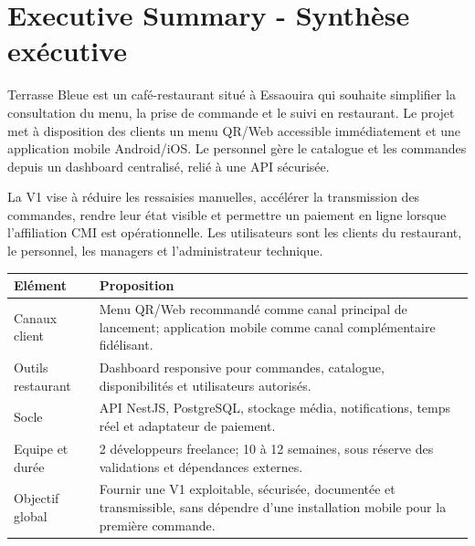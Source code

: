 \documentclass[10pt,a4paper]{article}
\begin{document}
\tableofcontents
\clearpage
{}

\setcounter{section}{0}
\section{Executive Summary - Synthèse exécutive}
Terrasse Bleue est un café-restaurant situé à Essaouira qui souhaite simplifier la consultation du menu, la prise de commande et le suivi en restaurant. Le projet met à disposition des clients un menu QR/Web accessible immédiatement et une application mobile Android/iOS. Le personnel gère le catalogue et les commandes depuis un dashboard centralisé, relié à une API sécurisée.

La V1 vise à réduire les ressaisies manuelles, accélérer la transmission des commandes, rendre leur état visible et permettre un paiement en ligne lorsque l'affiliation CMI est opérationnelle. Les utilisateurs sont les clients du restaurant, le personnel, les managers et l'administrateur technique.

\begin{tabularx}{\linewidth}{@{}L{4cm}Y@{}}
\toprule
\textbf{Elément} & \textbf{Proposition} \\
\midrule
Canaux client & Menu QR/Web recommandé comme canal principal de lancement; application mobile comme canal complémentaire fidélisant. \\
Outils restaurant & Dashboard responsive pour commandes, catalogue, disponibilités et utilisateurs autorisés. \\
Socle & API NestJS, PostgreSQL, stockage média, notifications, temps réel et adaptateur de paiement. \\
Equipe et durée & 2 développeurs freelance; 10 à 12 semaines, sous réserve des validations et dépendances externes. \\
Objectif global & Fournir une V1 exploitable, sécurisée, documentée et transmissible, sans dépendre d'une installation mobile pour la première commande. \\
\bottomrule
\end{tabularx}
\end{document}
